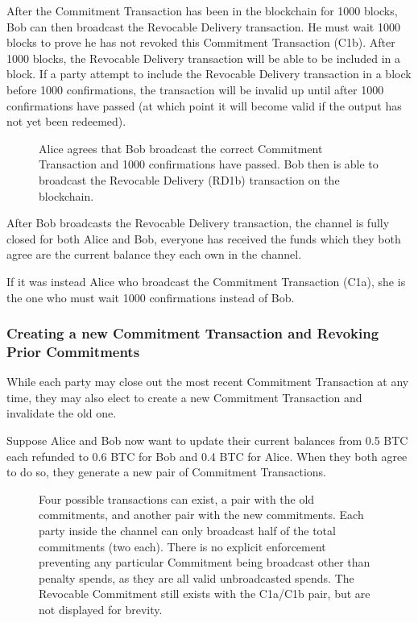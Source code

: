 \documentclass[letterpaper,11pt]{article}
\begin{document}
After the Commitment Transaction has been in the blockchain for 1000 blocks,
Bob can then broadcast the Revocable Delivery transaction. He must wait 1000
blocks to prove he has not revoked this Commitment Transaction (C1b). After
1000 blocks, the Revocable Delivery transaction will be able to be included in a
block. If a party attempt to include the Revocable Delivery transaction in a
block before 1000 confirmations, the transaction will be invalid up until after
1000 confirmations have passed (at which point it will become valid if the
output has not yet been redeemed).

\begin{figure}[H]
	\caption{Alice agrees that Bob broadcast the correct Commitment
		Transaction and 1000 confirmations have passed. Bob then is able
		to broadcast the Revocable Delivery (RD1b) transaction on the
		blockchain.
	}
\end{figure}

After Bob broadcasts the Revocable Delivery transaction, the channel is fully
closed for both Alice and Bob, everyone has received the funds which they both
agree are the current balance they each own in the channel.

If it was instead Alice who broadcast the Commitment Transaction (C1a), she is
the one who must wait 1000 confirmations instead of Bob.

\subsubsection{Creating a new Commitment Transaction and Revoking Prior
Commitments}

While each party may close out the most recent Commitment Transaction at any
time, they may also elect to create a new Commitment Transaction and invalidate
the old one.

Suppose Alice and Bob now want to update their current balances from 0.5 BTC
each refunded to 0.6 BTC for Bob and 0.4 BTC for Alice. When they both agree to
do so, they generate a new pair of Commitment Transactions.

\begin{figure}[H]
	\caption{Four possible transactions can exist, a pair with the old
		commitments, and another pair with the new commitments. Each
		party inside the channel can only broadcast half of the total
		commitments (two each). There is no explicit enforcement
		preventing any particular Commitment being broadcast other than
		penalty spends, as they are all valid unbroadcasted spends.
		The Revocable Commitment still exists with the C1a/C1b pair, but
		are not displayed for brevity.
	}
\end{figure}
\end{document}
